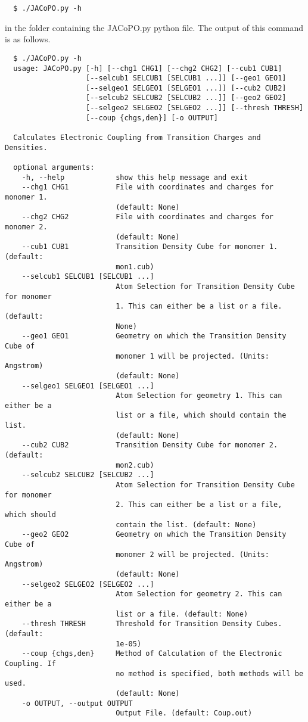 \documentclass[a4paper]{article}
\begin{document}
\begin{verbatim}
  $ ./JACoPO.py -h
\end{verbatim}

in the folder containing the JACoPO.py python file. The output of this command is as follows.

\begin{verbatim}
  $ ./JACoPO.py -h
  usage: JACoPO.py [-h] [--chg1 CHG1] [--chg2 CHG2] [--cub1 CUB1]
                   [--selcub1 SELCUB1 [SELCUB1 ...]] [--geo1 GEO1]
                   [--selgeo1 SELGEO1 [SELGEO1 ...]] [--cub2 CUB2]
                   [--selcub2 SELCUB2 [SELCUB2 ...]] [--geo2 GEO2]
                   [--selgeo2 SELGEO2 [SELGEO2 ...]] [--thresh THRESH]
                   [--coup {chgs,den}] [-o OUTPUT]
  
  Calculates Electronic Coupling from Transition Charges and Densities.
  
  optional arguments:
    -h, --help            show this help message and exit
    --chg1 CHG1           File with coordinates and charges for monomer 1.
                          (default: None)
    --chg2 CHG2           File with coordinates and charges for monomer 2.
                          (default: None)
    --cub1 CUB1           Transition Density Cube for monomer 1. (default:
                          mon1.cub)
    --selcub1 SELCUB1 [SELCUB1 ...]
                          Atom Selection for Transition Density Cube for monomer
                          1. This can either be a list or a file. (default:
                          None)
    --geo1 GEO1           Geometry on which the Transition Density Cube of
                          monomer 1 will be projected. (Units: Angstrom)
                          (default: None)
    --selgeo1 SELGEO1 [SELGEO1 ...]
                          Atom Selection for geometry 1. This can either be a
                          list or a file, which should contain the list.
                          (default: None)
    --cub2 CUB2           Transition Density Cube for monomer 2. (default:
                          mon2.cub)
    --selcub2 SELCUB2 [SELCUB2 ...]
                          Atom Selection for Transition Density Cube for monomer
                          2. This can either be a list or a file, which should
                          contain the list. (default: None)
    --geo2 GEO2           Geometry on which the Transition Density Cube of
                          monomer 2 will be projected. (Units: Angstrom)
                          (default: None)
    --selgeo2 SELGEO2 [SELGEO2 ...]
                          Atom Selection for geometry 2. This can either be a
                          list or a file. (default: None)
    --thresh THRESH       Threshold for Transition Density Cubes. (default:
                          1e-05)
    --coup {chgs,den}     Method of Calculation of the Electronic Coupling. If
                          no method is specified, both methods will be used.
                          (default: None)
    -o OUTPUT, --output OUTPUT
                          Output File. (default: Coup.out)

\end{verbatim}
\end{document}

